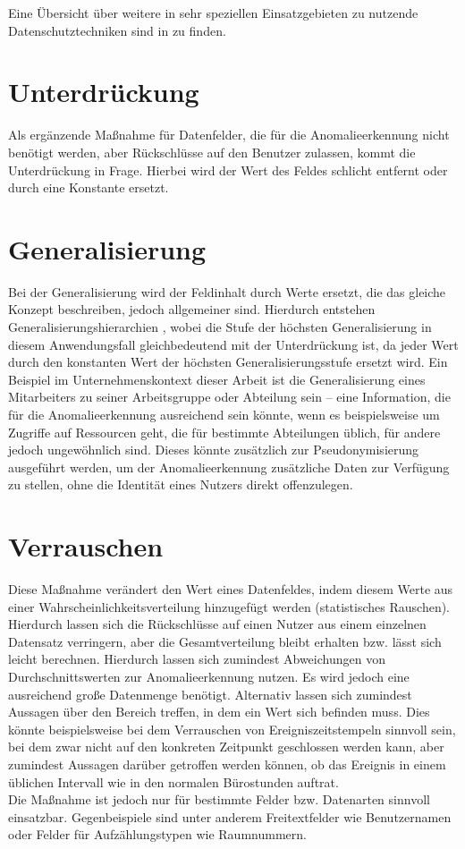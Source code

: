 Eine Übersicht über weitere in sehr speziellen Einsatzgebieten zu nutzende Datenschutztechniken sind in \cite{niksefat2017privacy} zu finden.

\section{Unterdrückung} %

Als ergänzende Maßnahme für Datenfelder, die für die Anomalieerkennung nicht benötigt werden, aber Rückschlüsse auf den Benutzer zulassen, kommt die Unterdrückung in Frage. Hierbei wird der Wert des Feldes schlicht entfernt oder durch eine Konstante ersetzt. 

\section{Generalisierung}

Bei der Generalisierung wird der Feldinhalt durch Werte ersetzt, die das gleiche Konzept beschreiben, jedoch allgemeiner sind. Hierdurch entstehen Generalisierungshierarchien , wobei die Stufe der höchsten Generalisierung in diesem Anwendungsfall gleichbedeutend mit der Unterdrückung ist, da jeder Wert durch den konstanten Wert der höchsten Generalisierungsstufe ersetzt wird. Ein Beispiel im Unternehmenskontext dieser Arbeit ist die Generalisierung eines Mitarbeiters zu seiner Arbeitsgruppe oder Abteilung sein -- eine Information, die für die Anomalieerkennung ausreichend sein könnte, wenn es beispielsweise um Zugriffe auf Ressourcen geht, die für bestimmte Abteilungen üblich, für andere jedoch ungewöhnlich sind. Dieses könnte zusätzlich zur Pseudonymisierung ausgeführt werden, um der Anomalieerkennung zusätzliche Daten zur Verfügung zu stellen, ohne die Identität eines Nutzers direkt offenzulegen.

\section{Verrauschen} %

Diese Maßnahme verändert den Wert eines Datenfeldes, indem diesem Werte aus einer Wahrscheinlichkeitsverteilung hinzugefügt werden (statistisches Rauschen). Hierdurch lassen sich die Rückschlüsse auf einen Nutzer aus einem einzelnen Datensatz verringern, aber die Gesamtverteilung bleibt erhalten bzw. lässt sich leicht berechnen. Hierdurch lassen sich zumindest Abweichungen von Durchschnittswerten zur Anomalieerkennung nutzen. Es wird jedoch eine ausreichend große Datenmenge benötigt. Alternativ lassen sich zumindest Aussagen über den Bereich treffen, in dem ein Wert sich befinden muss. Dies könnte beispielsweise bei dem Verrauschen von Ereigniszeitstempeln sinnvoll sein, bei dem zwar nicht auf den konkreten Zeitpunkt geschlossen werden kann, aber zumindest Aussagen darüber getroffen werden können, ob das Ereignis in einem üblichen Intervall wie in den normalen Bürostunden auftrat.\\
Die Maßnahme ist jedoch nur für bestimmte Felder bzw. Datenarten sinnvoll einsatzbar. Gegenbeispiele sind unter anderem Freitextfelder wie Benutzernamen oder Felder für Aufzählungstypen wie Raumnummern. 

